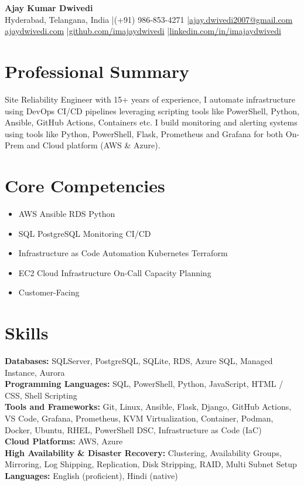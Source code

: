 \documentclass[10pt,a4paper]{article}
\begin{document}
\begin{center}
{\LARGE\bfseries Ajay Kumar Dwivedi}\\[4pt]
Hyderabad, Telangana, India \quad|\quad (+91) 986-853-4271 \quad|\quad \href{mailto:ajay.dwivedi2007@gmail.com}{ajay.dwivedi2007@gmail.com}\\
\href{https://ajaydwivedi.com/}{ajaydwivedi.com} \quad|\quad \href{https://github.com/imajaydwivedi}{github.com/imajaydwivedi} \quad|\quad \href{https://linkedin.com/in/imajaydwivedi/}{linkedin.com/in/imajaydwivedi}
\end{center}

\section{Professional Summary}
Site Reliability Engineer with 15+ years of experience, I automate infrastructure using DevOps CI/CD pipelines leveraging scripting tools like PowerShell, Python, Ansible, GitHub Actions, Containers etc. I build monitoring and alerting systems using tools like Python, PowerShell, Flask, Prometheus and Grafana for both On-Prem and Cloud platform (AWS \& Azure).

\section{Core Competencies}

\begin{itemize}
    \item AWS \quad\textbar\quad Ansible \quad\textbar\quad RDS \quad\textbar\quad Python
    \item SQL \quad\textbar\quad PostgreSQL \quad\textbar\quad Monitoring \quad\textbar\quad CI/CD
    \item Infrastructure as Code \quad\textbar\quad Automation \quad\textbar\quad Kubernetes \quad\textbar\quad Terraform
    \item EC2 \quad\textbar\quad Cloud Infrastructure \quad\textbar\quad On-Call \quad\textbar\quad Capacity Planning
    \item Customer-Facing
\end{itemize}

\section{Skills}
\textbf{Databases:} SQLServer, PostgreSQL, SQLite, RDS, Azure SQL, Managed Instance, Aurora\\
\textbf{Programming Languages:} SQL, PowerShell, Python, JavaScript, HTML / CSS, Shell Scripting\\
\textbf{Tools and Frameworks:} Git, Linux, Ansible, Flask, Django, GitHub Actions, VS Code, Grafana, Prometheus, KVM Virtualization, Container, Podman, Docker, Ubuntu, RHEL, PowerShell DSC, Infrastructure as Code (IaC)\\
\textbf{Cloud Platforms:} AWS, Azure\\
\textbf{High Availability \& Disaster Recovery:} Clustering, Availability Groups, Mirroring, Log Shipping, Replication, Disk Stripping, RAID, Multi Subnet Setup\\
\textbf{Languages:} English (proficient), Hindi (native)
\end{document}

